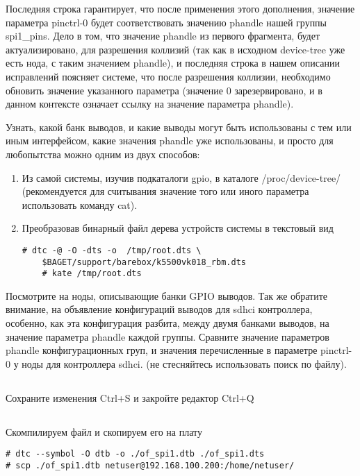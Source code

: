 Последняя строка гарантирует, что после применения этого дополнения, значение параметра pinctrl-0 будет соответствовать значению phandle нашей группы spi1\_pins. Дело в том, что значение phandle из первого фрагмента, будет  актуализировано, для разрешения коллизий (так как в исходном device-tree уже есть нода, с таким значением phandle), и последняя строка в нашем описании исправлений поясняет системе, что после разрешения коллизии, необходимо обновить значение указанного параметра (значение 0 зарезервировано, и в данном контексте означает ссылку на значение параметра phandle).  

Узнать, какой банк выводов, и какие выводы могут быть использованы с тем или иным интерфейсом, какие значения phandle уже использованы, и просто для любопытства можно одним из двух способов:

\begin{enumerate}
	\item Из самой системы, изучив подкаталоги gpio, в каталоге /proc/device-tree/ (рекомендуется для считывания значение того или иного параметра использовать команду cat). 
	
	\item Преобразовав бинарный файл дерева устройств системы в текстовый вид 
	\begin{lstlisting}[style=bash]
	# dtc -@ -O -dts -o  /tmp/root.dts \
	$BAGET/support/barebox/k5500vk018_rbm.dts
	# kate /tmp/root.dts
	\end{lstlisting}
\end{enumerate}

Посмотрите на ноды, описывающие банки GPIO выводов. Так же обратите внимание, на объявление конфигураций выводов для sdhci контроллера, особенно, как эта конфигурация разбита, между двумя банками выводов, на значение параметра phandle каждой группы. Сравните значение параметров phandle конфигурационных груп, и значения перечисленные в параметре pinctrl-0 у ноды для контроллера  sdhci. (не стесняйтесь использовать поиск по файлу).

\subsection{}Сохраните изменения Ctrl+S и закройте редактор Ctrl+Q 

\subsection{}Скомпилируем файл и скопируем его на плату
\begin{lstlisting}[style=bash]
# dtc --symbol -O dtb -o ./of_spi1.dtb ./of_spi1.dts
# scp ./of_spi1.dtb netuser@192.168.100.200:/home/netuser/
\end{lstlisting}

